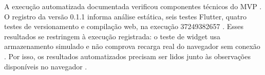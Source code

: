 A execução automatizada documentada verificou componentes técnicos do MVP . O registro da versão 0.1.1 informa análise estática, seis testes Flutter, quatro testes de versionamento e compilação web, na execução 37249382657 . Esses resultados se restringem à execução registrada: o teste de widget usa armazenamento simulado e não comprova recarga real do navegador sem conexão . Por isso, os resultados automatizados precisam ser lidos junto às observações disponíveis no navegador .
